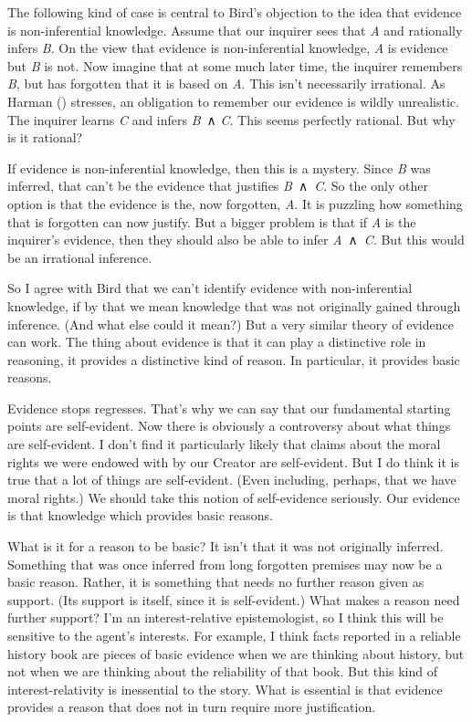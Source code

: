 \documentclass[
  10pt,
  letterpaper,
  twoside]{scrbook}
\begin{document}
The following kind of case is central to Bird's objection to the idea
that evidence is non-inferential knowledge. Assume that our inquirer
sees that \emph{A} and rationally infers \emph{B}. On the view that
evidence is non-inferential knowledge, \emph{A} is evidence but \emph{B}
is not. Now imagine that at some much later time, the inquirer remembers
\emph{B}, but has forgotten that it is based on \emph{A}. This isn't
necessarily irrational. As Harman ()
stresses, an obligation to remember our evidence is wildly unrealistic.
The inquirer learns \emph{C} and infers \emph{B}~∧ \emph{C}. This seems
perfectly rational. But why is it rational?

If evidence is non-inferential knowledge, then this is a mystery. Since
\emph{B} was inferred, that can't be the evidence that justifies
\emph{B}~∧~\emph{C}. So the only other option is that the evidence is
the, now forgotten, \emph{A}. It is puzzling how something that is
forgotten can now justify. But a bigger problem is that if \emph{A} is
the inquirer's evidence, then they should also be able to infer
\emph{A}~∧~\emph{C}. But this would be an irrational inference.

So I agree with Bird that we can't identify evidence with
non-inferential knowledge, if by that we mean knowledge that was not
originally gained through inference. (And what else could it mean?) But
a very similar theory of evidence can work. The thing about evidence is
that it can play a distinctive role in reasoning, it provides a
distinctive kind of reason. In particular, it provides basic reasons.

Evidence stops regresses. That's why we can say that our fundamental
starting points are self-evident. Now there is obviously a controversy
about what things are self-evident. I don't find it particularly likely
that claims about the moral rights we were endowed with by our Creator
are self-evident. But I do think it is true that a lot of things are
self-evident. (Even including, perhaps, that we have moral rights.) We
should take this notion of self-evidence seriously. Our evidence is that
knowledge which provides basic reasons.

What is it for a reason to be basic? It isn't that it was not originally
inferred. Something that was once inferred from long forgotten premises
may now be a basic reason. Rather, it is something that needs no further
reason given as support. (Its support is itself, since it is
self-evident.) What makes a reason need further support? I'm an
interest-relative epistemologist, so I think this will be sensitive to
the agent's interests. For example, I think facts reported in a reliable
history book are pieces of basic evidence when we are thinking about
history, but not when we are thinking about the reliability of that
book. But this kind of interest-relativity is inessential to the story.
What is essential is that evidence provides a reason that does not in
turn require more justification.
\end{document}
